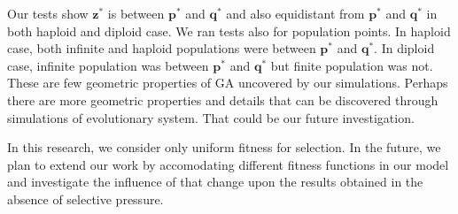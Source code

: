 Our tests show $\bm{z}^\ast$ is between $\bm{p}^\ast$ and $\bm{q}^\ast$ 
and also equidistant from $\bm{p}^\ast$ and $\bm{q}^\ast$ in both haploid and diploid case. 
We ran tests also for population points. In haploid case, 
both infinite and haploid populations were between $\bm{p}^\ast$ and $\bm{q}^\ast$. 
In diploid case, infinite population was between $\bm{p}^\ast$ and $\bm{q}^\ast$ but finite population was not. 
These are few geometric properties of GA uncovered by our simulations. 
Perhaps there are more geometric properties and details that can be discovered through simulations of evolutionary system.
That could be our future investigation.

In this research, we consider only uniform fitness for selection.  
In the future, we plan to extend our work by accomodating different fitness functions in our model and investigate 
the influence of that change upon the results obtained in the absence of selective pressure.



